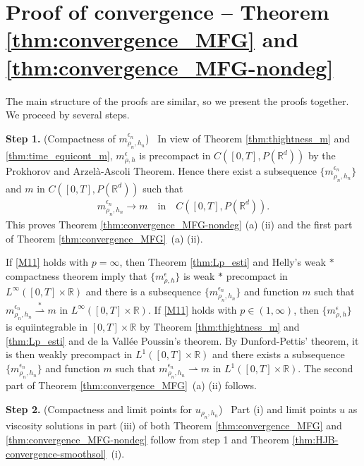 \documentclass[a4paper,  twoside, 10pt, leqno]{amsart}
\newcommand{\R}{\mathbb{R}}
\newcommand{\rd}{\mathbb{R}^d}
\theoremstyle{remark}
\theoremstyle{definition}
\begin{document}
\section{Proof of convergence -- Theorem  \ref{thm:convergence_MFG} and \ref{thm:convergence_MFG-nondeg}} \label{sec:proof-main}

The main structure of the proofs are similar, so we present the proofs together.  We proceed by several steps. \smallskip

\noindent \textbf{Step 1.} (Compactness of $m^{\epsilon_n}_{\rho_n,h_n}$) \ 
 In view of Theorem \ref{thm:thightness_m} and  \ref{thm:time_equicont_m},  $m^{\epsilon}_{\rho,h}$ is precompact in $C([0,T], P(\rd))$ by the Prokhorov and Arzel\`a-Ascoli Theorem.   Hence there exist a subsequence $\{m^{\epsilon_n}_{\rho_n,h_n}\}$ and $m$ in $ C([0,T], P(\rd))$ such that 
\begin{align*}
m^{\epsilon_n}_{\rho_n,h_n} \rightarrow m \quad \mbox{in} \quad C([0,T],P(\rd)).
\end{align*} 
This proves Theorem \ref{thm:convergence_MFG-nondeg} (a) (ii) and the first part of Theorem \ref{thm:convergence_MFG}~(a) (ii).\smallskip

If \ref{M11} holds with $p=\infty$, then Theorem \ref{thm:Lp_esti} and Helly's weak $*$ compactness theorem imply that $\{m^{\epsilon}_{\rho,h}\}$ is weak $*$ precompact  in $L^{\infty}([0,T]\times \R)$ and there is a subsequence $\{m^{\epsilon_n}_{\rho_n,h_n}\}$ and function $m$  such that $m^{\epsilon_n}_{\rho_n,h_n} \overset{\ast}{\rightharpoonup} m$ in $L^{\infty}([0,T]\times \R)$. If \ref{M11} holds with  $p \in (1,\infty)$, then $\{m^{\epsilon}_{\rho,h}\}$ is equiintegrable in $[0,T]\times \R$ by Theorem 
\ref{thm:thightness_m} and \ref{thm:Lp_esti} and  de la Vall\'ee Poussin's theorem. By Dunford-Pettis' theorem, it is then weakly precompact in $L^1([0,T]\times \R)$ and there exists a subsequence $\{m^{\epsilon_n}_{\rho_n,h_n}\}$ and function $m$ such that $m^{\epsilon_n}_{\rho_n,h_n} \rightharpoonup  m$ in $L^{1}([0,T]\times \R)$. 
The second part  of Theorem \ref{thm:convergence_MFG}~(a) (ii) follows. \medskip

\noindent \textbf{Step 2.} (Compactness and limit points for $u_{\rho_n,h_n}$) \ Part (i)  and limit points $u$ as viscosity solutions in part (iii)  of both Theorem \ref{thm:convergence_MFG} and \ref{thm:convergence_MFG-nondeg} follow from step 1 and Theorem  \ref{thm:HJB-convergence-smoothsol}~(i). \medskip
\end{document}
